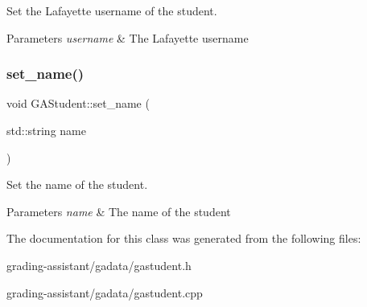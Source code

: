 Set the Lafayette username of the student. 


\begin{DoxyParams}{Parameters}
{\em username} & The Lafayette username \\
\hline
\end{DoxyParams}
\mbox{\label{class_g_a_student_ab8224579ce2618e60455a8a73b1473f9}} 
\subsubsection{\texorpdfstring{set\+\_\+name()}{set\_name()}}
{\footnotesize\ttfamily void G\+A\+Student\+::set\+\_\+name (\begin{DoxyParamCaption}\item[{std\+::string}]{name }\end{DoxyParamCaption})}



Set the name of the student. 


\begin{DoxyParams}{Parameters}
{\em name} & The name of the student \\
\hline
\end{DoxyParams}


The documentation for this class was generated from the following files\+:\begin{DoxyCompactItemize}
\item 
grading-\/assistant/gadata/gastudent.\+h\item 
grading-\/assistant/gadata/gastudent.\+cpp\end{DoxyCompactItemize}
